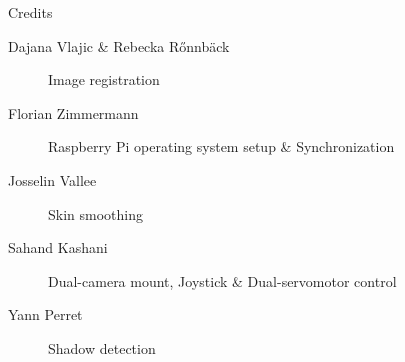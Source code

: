 \documentclass[10pt]{article}
\begin{document}



\begin{section}{Credits}
    \begin{description}
        \item [Dajana Vlajic \& Rebecka R{\H o}nnb{\"a}ck] Image registration
        \item [Florian Zimmermann] Raspberry Pi operating system setup \& Synchronization
        \item [Josselin Vallee] Skin smoothing
        \item [Sahand Kashani] Dual-camera mount, Joystick \& Dual-servomotor control
        \item [Yann Perret] Shadow detection
    \end{description}
\end{section}
\end{document}
